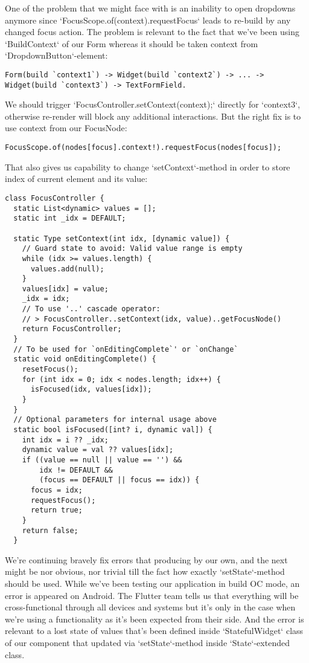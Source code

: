 One of the problem that we might face with is an inability to open dropdowns anymore since 
`FocusScope.of(context).requestFocus` leads to re-build by any changed focus action. The problem is relevant to the
fact that we've been using `BuildContext` of our Form whereas it should be taken context from `DropdownButton`-element:

\begin{lstlisting}
Form(build `context1`) -> Widget(build `context2`) -> ... -> Widget(build `context3`) -> TextFormField.
\end{lstlisting}

\noindent We should trigger `FocusController.setContext(context);` directly for `context3`, otherwise re-render will 
block any additional interactions. But the right fix is to use context from our FocusNode:

\begin{lstlisting}
FocusScope.of(nodes[focus].context!).requestFocus(nodes[focus]);
\end{lstlisting}

\noindent That also gives us capability to change `setContext`-method in order to store index of current element 
and its value:

\begin{lstlisting}
class FocusController {
  static List<dynamic> values = [];
  static int _idx = DEFAULT;

  static Type setContext(int idx, [dynamic value]) {
    // Guard state to avoid: Valid value range is empty
    while (idx >= values.length) {
      values.add(null);
    }
    values[idx] = value;
    _idx = idx;
    // To use '..' cascade operator:
    // > FocusController..setContext(idx, value)..getFocusNode()
    return FocusController; 
  }
  // To be used for `onEditingComplete`' or `onChange`
  static void onEditingComplete() {
    resetFocus();
    for (int idx = 0; idx < nodes.length; idx++) {
      isFocused(idx, values[idx]);
    }
  }
  // Optional parameters for internal usage above
  static bool isFocused([int? i, dynamic val]) {
    int idx = i ?? _idx;
    dynamic value = val ?? values[idx];
    if ((value == null || value == '') &&
        idx != DEFAULT &&
        (focus == DEFAULT || focus == idx)) {
      focus = idx;
      requestFocus();
      return true;
    }
    return false;
  }
\end{lstlisting}

We're continuing bravely fix errors that producing by our own, and the next might be nor obvious, nor trivial till 
the fact how exactly `setState`-method should be used. While we've been testing our application in build OC mode, an 
error is appeared on Android. The Flutter team tells us that everything will be cross-functional through all devices
and systems but it's only in the case when we're using a functionality as it's been expected from their side. And 
the error is relevant to a lost state of values that's been defined inside `StatefulWidget` class of our 
component that updated via `setState`-method inside `State`-extended class.

